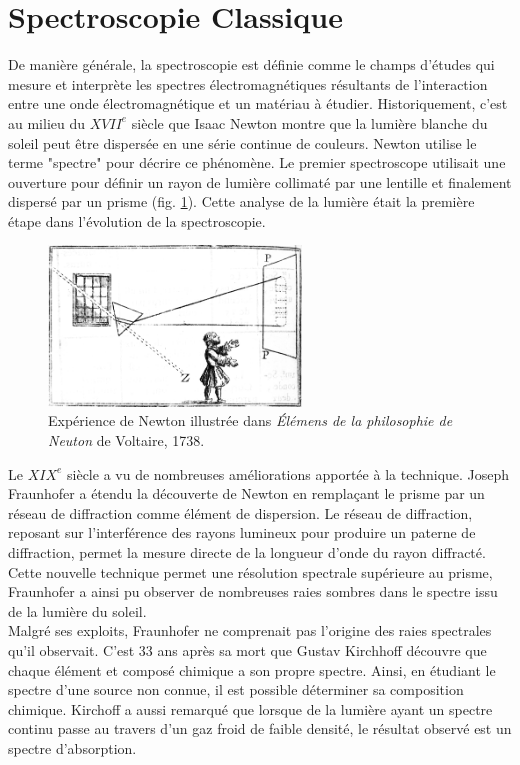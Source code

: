 \documentclass[a4paper]{report}
\begin{document}
	\section{Spectroscopie Classique}
	De manière générale, la spectroscopie est définie comme le champs d'études qui mesure et interprète les spectres électromagnétiques résultants de l'interaction entre une onde électromagnétique et un matériau à étudier.
	Historiquement, c'est au milieu du $XVII^{e}$ siècle que Isaac Newton montre que la lumière blanche du soleil peut être dispersée en une série continue de couleurs. Newton utilise le terme "spectre" pour décrire ce phénomène. Le premier spectroscope utilisait une ouverture pour définir un rayon de lumière collimaté par une lentille et finalement dispersé par un prisme (fig. \ref{illus:newton}). Cette analyse de la lumière était la première étape dans l'évolution de la spectroscopie.\\
	\begin{figure}[h]	
		\begin{center}			
		\includegraphics[width=0.6\textwidth]{spectro_newton}
		\caption{Expérience de Newton illustrée dans \textit{Élémens de la philosophie de Neuton} de Voltaire, 1738.}
		\label{illus:newton}				
		\end{center}
	\end{figure}
	Le $XIX^{e}$ siècle	a vu de nombreuses améliorations apportée à la technique. Joseph Fraunhofer a étendu la découverte de Newton en remplaçant le prisme par un réseau de diffraction comme élément de dispersion. Le réseau de diffraction, reposant sur l'interférence des rayons lumineux pour produire un paterne de diffraction, permet la mesure directe de la longueur d'onde du rayon diffracté. Cette nouvelle technique permet une résolution spectrale supérieure au prisme, Fraunhofer a ainsi pu observer de nombreuses raies sombres dans le spectre issu de la lumière du soleil.\\
	Malgré ses exploits, Fraunhofer ne comprenait pas l'origine des raies spectrales qu'il observait. C'est 33 ans après sa mort que Gustav Kirchhoff découvre que chaque élément et composé chimique a son propre spectre. Ainsi, en étudiant le spectre d'une source non connue, il est possible déterminer sa composition chimique. Kirchoff a aussi remarqué que lorsque de la lumière ayant un spectre continu passe au travers d'un gaz froid de faible densité, le résultat observé est un spectre d'absorption.\\
\end{document}
